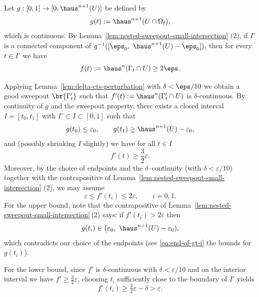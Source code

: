 
Let $g:[0,1]\to[0,\haus^{n+1}(U)]$ be defined by
\begin{equation*}
  g(t):=\haus^{n+1}(U\cap\Omega_t),
\end{equation*}
which is continuous. %
By Lemma~\ref{lem:nested-sweepout-small-intersection} (2), if $I'$ is a connected component of
$g^{-1}([\eps_0,\ \haus^{n+1}(U)-\eps_0])$, then for every $t\in I'$ we have
\begin{equation*}
  f(t):=\haus^{n}(\Gamma_t\cap U) \ge 2\eps.
\end{equation*}

Applying Lemma~\ref{lem:delta-cts-perturbation} with $\delta<\eps/10$ we obtain a good sweepout
$\br{\Gamma_t'}$ such that $f'(t):=\haus^{n}(\Gamma_t'\cap U)$ is $\delta$-continuous. 
By continuity of $g$ and the sweepout property, there exists a closed interval $I=[t_0,t_1]$ with $I'\subset I\subset[0,1]$ such that
\begin{equation}\label{eq:end-of-gt-i}
  g(t_0)\le \varepsilon_0,\qquad g(t_1)\ge \haus^{n+1}(U)-\varepsilon_0,
\end{equation}
and (possibly shrinking $I$ slightly) we have for all $t\in I$
\begin{equation*}
  f'(t) \ge \frac{3}{2}\varepsilon.
\end{equation*}
Moreover, by the choice of endpoints and the $\delta$–continuity (with $\delta<\varepsilon/10$) together with the contrapositive of Lemma~\ref{lem:nested-sweepout-small-intersection} (2), we may assume
\begin{equation*}
  \varepsilon \le f'(t_i) \le 2\varepsilon, \qquad i=0,1.
\end{equation*}
For the upper bound, note that the contrapositive of Lemma~\ref{lem:nested-sweepout-small-intersection}\,(2) says:
if $f'(t_i)>2\varepsilon$ then 
\begin{equation*}
    g(t_i)\in\bigl(\varepsilon_0,\ \haus^{n+1}(U)-\varepsilon_0),
\end{equation*}
which contradicts our choice of the endpoints (see \ref{eq:end-of-gt-i} the bounds for $g(t_i)$).

For the lower bound, since $f'$ is $\delta$-continuous with $\delta<\varepsilon/10$ and
on the interior interval we have $f'\ge \tfrac{3}{2}\varepsilon$, choosing $t_i$ sufficiently close to the boundary of $I'$ yields
\begin{equation*}
    f'(t_i) \ge \tfrac{3}{2}\varepsilon-\delta > \varepsilon.
\end{equation*}

